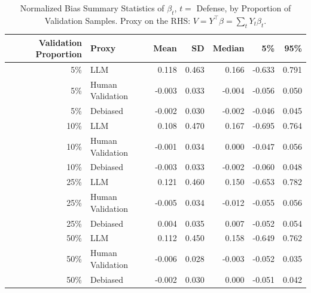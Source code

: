 \begin{table}

\caption{\label{tab:unnamed-chunk-1}Normalized Bias Summary Statistics of $\beta_{t}$, $t=$ Defense, by Proportion of Validation Samples.
      Proxy on the RHS: $V = Y^\top \beta = \sum_{t} Y_t \beta_t$.}
\centering
\begin{tabular}[t]{rlrrrrr}
\toprule
Validation Proportion & Proxy & Mean & SD & Median & 5\% & 95\%\\
\midrule
5\% & LLM & 0.118 & 0.463 & 0.166 & -0.633 & 0.791\\
5\% & Human Validation & -0.003 & 0.033 & -0.004 & -0.056 & 0.050\\
5\% & Debiased & -0.002 & 0.030 & -0.002 & -0.046 & 0.045\\
10\% & LLM & 0.108 & 0.470 & 0.167 & -0.695 & 0.764\\
10\% & Human Validation & -0.001 & 0.034 & 0.000 & -0.047 & 0.056\\
10\% & Debiased & -0.003 & 0.033 & -0.002 & -0.060 & 0.048\\
25\% & LLM & 0.121 & 0.460 & 0.150 & -0.653 & 0.782\\
25\% & Human Validation & -0.005 & 0.034 & -0.012 & -0.055 & 0.056\\
25\% & Debiased & 0.004 & 0.035 & 0.007 & -0.052 & 0.054\\
50\% & LLM & 0.112 & 0.450 & 0.158 & -0.649 & 0.762\\
50\% & Human Validation & -0.006 & 0.028 & -0.003 & -0.052 & 0.035\\
50\% & Debiased & -0.002 & 0.030 & 0.000 & -0.051 & 0.042\\
\bottomrule
\end{tabular}
\end{table}

